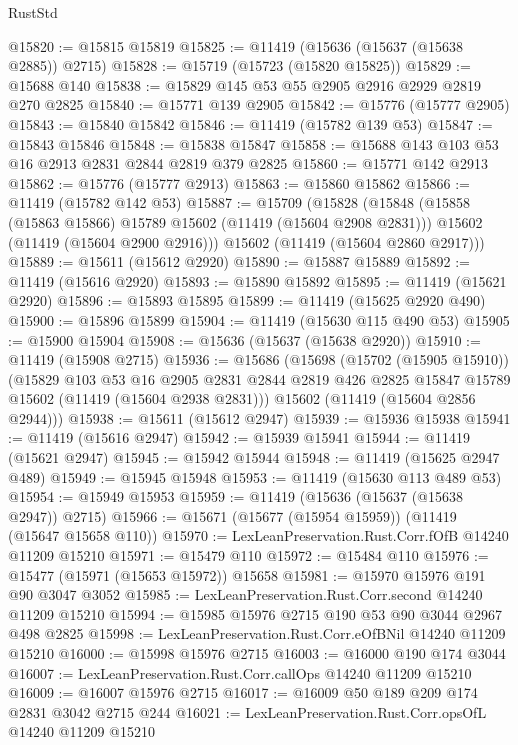 \begin{lexlean}{RustStd}
\begin{coremodule}
@15820 := @15815 @15819
@15825 := @11419 (@15636 (@15637 (@15638 @2885)) @2715)
@15828 := @15719 (@15723 (@15820 @15825))
@15829 := @15688 @140
@15838 := @15829 @145 @53 @55 @2905 @2916 @2929 @2819 @270 @2825
@15840 := @15771 @139 @2905
@15842 := @15776 (@15777 @2905)
@15843 := @15840 @15842
@15846 := @11419 (@15782 @139 @53)
@15847 := @15843 @15846
@15848 := @15838 @15847
@15858 := @15688 @143 @103 @53 @16 @2913 @2831 @2844 @2819 @379 @2825
@15860 := @15771 @142 @2913
@15862 := @15776 (@15777 @2913)
@15863 := @15860 @15862
@15866 := @11419 (@15782 @142 @53)
@15887 := @15709
    (@15828
      (@15848
        (@15858 (@15863 @15866) @15789 @15602 (@11419 (@15604 @2908 @2831)))
        @15602
        (@11419 (@15604 @2900 @2916)))
      @15602
      (@11419 (@15604 @2860 @2917)))
@15889 := @15611 (@15612 @2920)
@15890 := @15887 @15889
@15892 := @11419 (@15616 @2920)
@15893 := @15890 @15892
@15895 := @11419 (@15621 @2920)
@15896 := @15893 @15895
@15899 := @11419 (@15625 @2920 @490)
@15900 := @15896 @15899
@15904 := @11419 (@15630 @115 @490 @53)
@15905 := @15900 @15904
@15908 := @15636 (@15637 (@15638 @2920))
@15910 := @11419 (@15908 @2715)
@15936 := @15686
    (@15698
      (@15702 (@15905 @15910))
      (@15829
        @103
        @53
        @16
        @2905
        @2831
        @2844
        @2819
        @426
        @2825
        @15847
        @15789
        @15602
        (@11419 (@15604 @2938 @2831)))
      @15602
      (@11419 (@15604 @2856 @2944)))
@15938 := @15611 (@15612 @2947)
@15939 := @15936 @15938
@15941 := @11419 (@15616 @2947)
@15942 := @15939 @15941
@15944 := @11419 (@15621 @2947)
@15945 := @15942 @15944
@15948 := @11419 (@15625 @2947 @489)
@15949 := @15945 @15948
@15953 := @11419 (@15630 @113 @489 @53)
@15954 := @15949 @15953
@15959 := @11419 (@15636 (@15637 (@15638 @2947)) @2715)
@15966 := @15671 (@15677 (@15954 @15959)) (@11419 (@15647 @15658 @110))
@15970 := LexLeanPreservation.Rust.Corr.fOfB @14240 @11209 @15210
@15971 := @15479 @110
@15972 := @15484 @110
@15976 := @15477 (@15971 (@15653 @15972)) @15658
@15981 := @15970 @15976 @191 @90 @3047 @3052
@15985 := LexLeanPreservation.Rust.Corr.second @14240 @11209 @15210
@15994 := @15985 @15976 @2715 @190 @53 @90 @3044 @2967 @498 @2825
@15998 := LexLeanPreservation.Rust.Corr.eOfBNil @14240 @11209 @15210
@16000 := @15998 @15976 @2715
@16003 := @16000 @190 @174 @3044
@16007 := LexLeanPreservation.Rust.Corr.callOps @14240 @11209 @15210
@16009 := @16007 @15976 @2715
@16017 := @16009 @50 @189 @209 @174 @2831 @3042 @2715 @244
@16021 := LexLeanPreservation.Rust.Corr.opsOfL @14240 @11209 @15210

\end{coremodule}
\end{lexlean}
